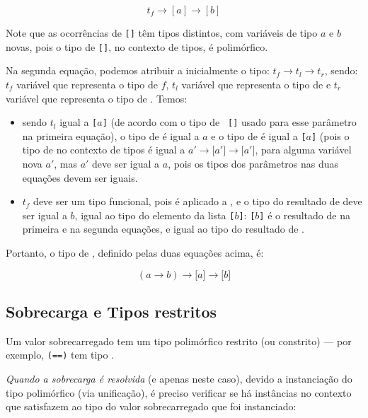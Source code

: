 {\ttfamily
  \[ t_f \rightarrow [a] \rightarrow [b] \]
}

Note que as ocorrências de {\tt []} têm tipos distintos, com variáveis
de tipo $a$ e $b$ novas, pois o tipo de {\tt []}, no contexto de
tipos, é polimórfico.

Na segunda equação, podemos atribuir a  inicialmente o tipo:
$t_f \rightarrow t_l \rightarrow t_r$, sendo:
     $t_f$ variável que representa o tipo de $f$,  
     $t_l$ variável que representa o tipo de  e
     $t_r$ variável que representa o tipo de .
Temos:

\begin{itemize}
  \item sendo $t_l$ igual a {\tt [$a$]} (de acordo com o tipo de {\tt
    []} usado para esse parâmetro na primeira equação), o tipo de
     é igual a $a$ e o tipo de  é igual a {\tt [$a$]}
    (pois o tipo de \ina{(:)} no contexto de tipos é igual a
    $a'\rightarrow \texttt{[$a'$]} \rightarrow \texttt{[$a'$]}$, para
    alguma variável nova $a'$, mas $a'$ deve ser igual a $a$, pois os
    tipos dos parâmetros nas duas equações devem ser iguais.

  \item $t_f$ deve ser um tipo funcional, pois  é aplicado a
    , e o tipo do resultado de  deve ser igual a $b$,
    igual ao tipo do elemento da lista {\tt [$b$]}: {\tt [$b$]} é o
    resultado de  na primeira e na segunda equações, e
    igual ao tipo do resultado de .

\end{itemize}

Portanto, o tipo de , definido pelas duas equações acima, é:

\[ (a \rightarrow b) \rightarrow \texttt{[$a$]} \rightarrow \texttt{[$b$]}
\]

\subsection{Sobrecarga e Tipos restritos}
\label{Tipos-restritos}

Um valor sobrecarregado tem um tipo polimórfico restrito (ou
constrito) --- por exemplo, {\tt (==)} tem tipo
  .

{\em Quando a sobrecarga é resolvida\/} (e apenas neste caso), devido
a instanciação do tipo polimórfico (via unificação), é preciso
verificar se há instâncias no contexto que satisfazem ao tipo do valor
sobrecarregado que foi instanciado:

